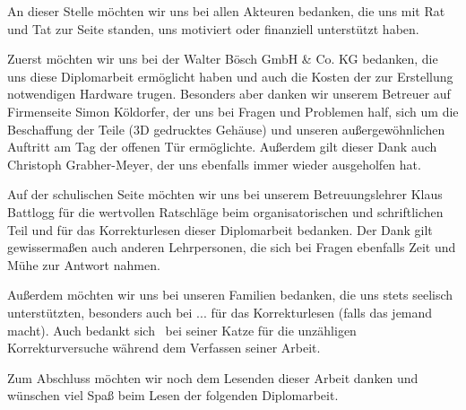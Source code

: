 An dieser Stelle möchten wir uns bei allen Akteuren bedanken, die uns mit Rat und Tat zur Seite standen, uns motiviert oder finanziell unterstützt haben.

Zuerst möchten wir uns bei der Walter Bösch GmbH \& Co. KG bedanken, die uns diese Diplomarbeit ermöglicht haben und auch die Kosten der zur Erstellung notwendigen Hardware trugen. Besonders aber danken wir unserem Betreuer auf Firmenseite Simon Köldorfer, der uns bei Fragen und Problemen half, sich um die Beschaffung der Teile (\zB 3D gedrucktes Gehäuse) und unseren außergewöhnlichen Auftritt am Tag der offenen Tür ermöglichte. Außerdem gilt dieser Dank auch Christoph Grabher-Meyer, der uns ebenfalls immer wieder ausgeholfen hat.

Auf der schulischen Seite möchten wir uns bei unserem Betreuungslehrer Klaus Battlogg für die wertvollen Ratschläge beim organisatorischen und schriftlichen Teil und für das Korrekturlesen dieser Diplomarbeit bedanken. Der Dank gilt gewissermaßen auch anderen Lehrpersonen, die sich bei Fragen ebenfalls Zeit und Mühe zur Antwort nahmen.

Außerdem möchten wir uns bei unseren Familien bedanken, die uns stets seelisch unterstützten, besonders auch bei ... für das Korrekturlesen (falls das jemand macht).
Auch bedankt sich \pezze\ bei seiner Katze für die unzähligen Korrekturversuche während dem Verfassen seiner Arbeit.

Zum Abschluss möchten wir noch dem Lesenden dieser Arbeit danken und wünschen viel Spaß beim Lesen der folgenden Diplomarbeit.